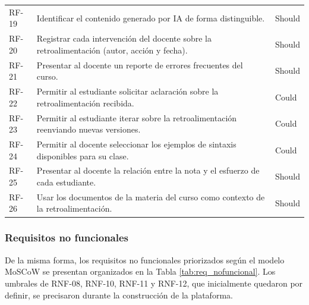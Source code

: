 \documentclass[letterpaper, 10 pt, conference]{ieeeconf}
\begin{document}
\begin{table}[ht]
\begin{tabular}{lp{5.0cm}l}
		RF-19 & Identificar el contenido generado por IA de forma distinguible. & Should \\
		RF-20 & Registrar cada intervención del docente sobre la retroalimentación (autor, acción y fecha). & Should \\
		RF-21 & Presentar al docente un reporte de errores frecuentes del curso. & Should \\
		RF-22 & Permitir al estudiante solicitar aclaración sobre la retroalimentación recibida. & Could \\
		RF-23 & Permitir al estudiante iterar sobre la retroalimentación reenviando nuevas versiones. & Could \\
		RF-24 & Permitir al docente seleccionar los ejemplos de sintaxis disponibles para su clase. & Could \\
		RF-25 & Presentar al docente la relación entre la nota y el esfuerzo de cada estudiante. & Should \\
		RF-26 & Usar los documentos de la materia del curso como contexto de la retroalimentación. & Should \\
		\hline
	\end{tabular}
\end{table}

\subsubsection{Requisitos no funcionales}
De la misma forma, los requisitos no funcionales priorizados según el modelo MoSCoW se presentan organizados en la Tabla \ref{tab:req_nofuncional}. Los umbrales de RNF-08, RNF-10, RNF-11 y RNF-12, que inicialmente quedaron por definir, se precisaron durante la construcción de la plataforma.
\end{document}
